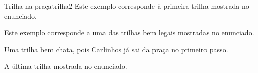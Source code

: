 \documentclass[12pt,a4paper,oneside]{article}
\begin{document}
\begin{problem}{Trilha na praça}{trilha}{2}
Este exemplo corresponde à primeira trilha mostrada no enunciado.

\begin{example}
%
\end{example}

Este exemplo corresponde a uma das trilhas bem legais mostradas no enunciado.


\vspace{30pt}

\begin{example}
%
\end{example}

Uma trilha bem chata, pois Carlinhos já sai da praça no primeiro passo.


\vspace{30pt}

\begin{example}
%
\end{example}

A última trilha mostrada no enunciado.


\vspace{30pt}

\begin{example}
%
\end{example}




\end{problem}
\end{document}
